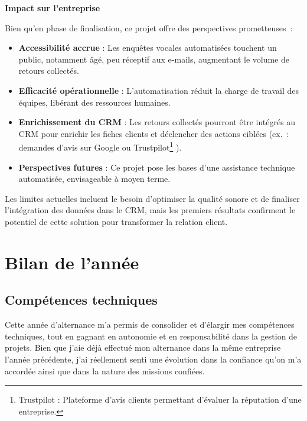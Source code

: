 \textbf{Impact sur l’entreprise}\vspace{0.3cm}

Bien qu’en phase de finalisation, ce projet offre des perspectives prometteuses~:

\begin{itemize}
    \item \textbf{Accessibilité accrue} : Les enquêtes vocales automatisées touchent un public, notamment âgé, peu réceptif aux e-mails, augmentant le volume de retours collectés.\vspace{0.3cm}
    \item \textbf{Efficacité opérationnelle} : L’automatisation réduit la charge de travail des équipes, libérant des ressources humaines.\vspace{0.3cm}
    \item \textbf{Enrichissement du CRM} : Les retours collectés pourront être intégrés au CRM pour enrichir les fiches clients et déclencher des actions ciblées (ex.~: demandes d’avis sur Google ou Trustpilot\footnote{Trustpilot : Plateforme d’avis clients permettant d’évaluer la réputation d’une entreprise.}
).\vspace{0.3cm}
    \item \textbf{Perspectives futures} : Ce projet pose les bases d’une assistance technique automatisée, envisageable à moyen terme.\vspace{0.3cm}
\end{itemize}

Les limites actuelles incluent le besoin d’optimiser la qualité sonore et de finaliser l’intégration des données dans le CRM, mais les premiers résultats confirment le potentiel de cette solution pour transformer la relation client.\vspace{0.3cm}





\newpage
\section{Bilan de l’année}
\label{bilan}

\subsection{Compétences techniques}

Cette année d’alternance m’a permis de consolider et d’élargir mes compétences techniques, tout en gagnant en autonomie et en responsabilité dans la gestion de projets. Bien que j’aie déjà effectué mon alternance dans la même entreprise l’année précédente, j’ai réellement senti une évolution dans la confiance qu’on m’a accordée ainsi que dans la nature des missions confiées.

